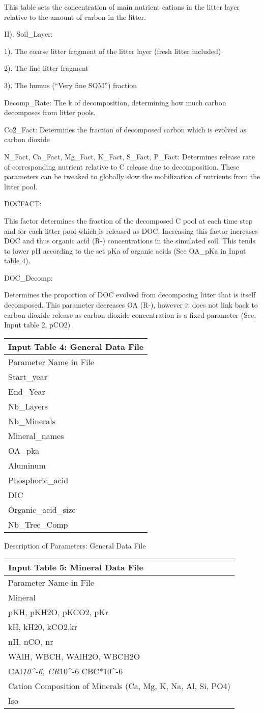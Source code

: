 \documentclass[
]{article}
\begin{document}
This table sets the concentration of main nutrient cations in the litter
layer relative to the amount of carbon in the litter.

II). Soil\_Layer:

1). The coarse litter fragment of the litter layer (fresh litter
included)

2). The fine litter fragment

3). The humus (``Very fine SOM'') fraction

Decomp\_Rate: The k of decomposition, determining how much carbon
decomposes from litter pools.

Co2\_Fact: Determines the fraction of decomposed carbon which is evolved
as carbon dioxide

N\_Fact, Ca\_Fact, Mg\_Fact, K\_Fact, S\_Fact, P\_Fact: Determines
release rate of corresponding nutrient relative to C release due to
decomposition. These parameters can be tweaked to globally slow the
mobilization of nutrients from the litter pool.

DOCFACT:

This factor determines the fraction of the decomposed C pool at each
time step and for each litter pool which is released as DOC. Increasing
this factor increases DOC and thus organic acid (R-) concentrations in
the simulated soil. This tends to lower pH according to the set pKa of
organic acids (See OA\_pKa in Input table 4).

DOC\_Decomp:

Determines the proportion of DOC evolved from decomposing litter that is
itself decomposed. This parameter decreases OA (R-), however it does not
link back to carbon dioxide release as carbon dioxide concentration is a
fixed parameter (See, Input table 2, pCO2)

\begin{longtable}[]{@{}l@{}}
\toprule
Input Table 4: General Data File\tabularnewline
\midrule
\endhead
Parameter Name in File\tabularnewline
Start\_year\tabularnewline
End\_Year\tabularnewline
Nb\_Layers\tabularnewline
Nb\_Minerals\tabularnewline
Mineral\_names\tabularnewline
OA\_pka\tabularnewline
Aluminum\tabularnewline
Phosphoric\_acid\tabularnewline
DIC\tabularnewline
Organic\_acid\_size\tabularnewline
Nb\_Tree\_Comp\tabularnewline
\bottomrule
\end{longtable}

Description of Parameters: General Data File

\begin{longtable}[]{@{}l@{}}
\toprule
Input Table 5: Mineral Data File\tabularnewline
\midrule
\endhead
Parameter Name in File\tabularnewline
Mineral\tabularnewline
pKH, pKH2O, pKCO2, pKr\tabularnewline
kH, kH20, kCO2,kr\tabularnewline
nH, nCO, nr\tabularnewline
WAlH, WBCH, WAlH2O, WBCH2O\tabularnewline
CAl\emph{10\^{}-6, CR}10\^{}-6 CBC*10\^{}-6\tabularnewline
Cation Composition of Minerals (Ca, Mg, K, Na, Al, Si,
PO4)\tabularnewline
Iso\tabularnewline
\bottomrule
\end{longtable}
\end{document}
